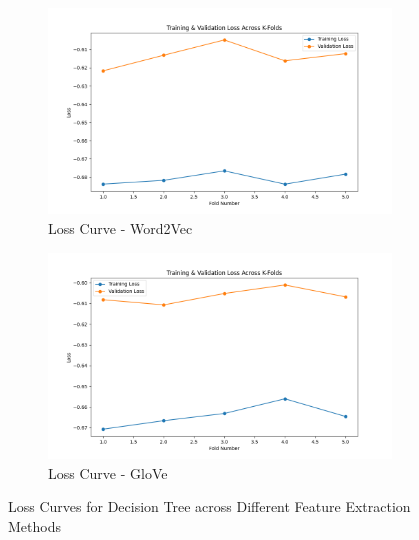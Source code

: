 \begin{figure}[H]
    \begin{subfigure}[b]{0.48\textwidth}
        \includegraphics[width=\textwidth]{img/report_info/img/1.2.DecisionTree/best_decision_tree_word2vec_loss.png}
        \caption{Loss Curve - Word2Vec}
        \label{fig:lr-word2vec-loss}
    \end{subfigure}
    \begin{subfigure}[b]{0.48\textwidth}
        \includegraphics[width=\textwidth]{img/report_info/img/1.2.DecisionTree/best_decision_tree_glove_loss.png}
        \caption{Loss Curve - GloVe}
        \label{fig:lr-glove-loss}
    \end{subfigure}
    
    \caption{Loss Curves for Decision Tree across Different Feature Extraction Methods}
    \label{fig:lr-loss-group}
\end{figure}

